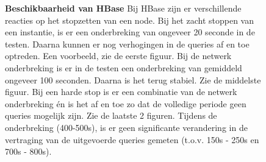 \begin{figure}[ht!] 
	\centering
	\caption{\textbf{Beschikbaarheid van HBase} \newline 
	Bij HBase zijn er verschillende reacties op het stopzetten van een node. Bij het zacht stoppen van een instantie, is er een onderbreking van ongeveer 20 seconde in de testen. Daarna kunnen er nog verhogingen in de queries af en toe optreden. Een voorbeeld, zie de eerste figuur. \newline
	Bij de netwerk onderbreking is er in de testen een onderbreking van gemiddeld ongeveer 100 seconden. Daarna is het terug stabiel. Zie de middelste figuur. \newline
	Bij een harde stop is er een combinatie van de netwerk onderbreking én is het af en toe zo dat de volledige periode geen queries mogelijk zijn. Zie de laatste 2 figuren.	 \newline
	Tijdens de onderbreking (400-500s), is er geen significante verandering in de vertraging van de uitgevoerde queries gemeten (t.o.v. 150s - 250s en 700s - 800s). 
	}
	\label{fig:beschikbaar-hbase-1}
\end{figure}

